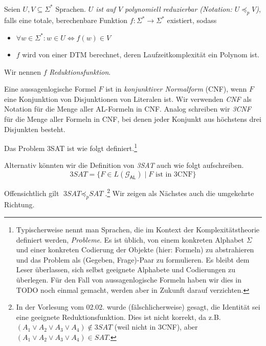 \begin{Def}\label{def:PolyReduktion}\ \\
  Seien $U, V \subseteq \Sigma^*$ Sprachen.
  \emph{$U$ ist auf $V$ polynomiell reduzierbar (Notation: $U \preceq_p V$)}, falls eine totale, berechenbare Funktion
  $f:\Sigma^* \to \Sigma^*$ existiert, sodass
  \begin{itemize}
   \item $\forall w \in \Sigma^*:w \in U \iff f(w) \in V$
   \item $f$ wird von einer \ac{DTM} berechnet, deren Laufzeitkomplexität ein Polynom ist.
  \end{itemize}
  Wir nennen $f$ \emph{Reduktionsfunktion}.
\end{Def}

Eine aussagenlogische Formel $F$ ist in \emph{konjunktiver Normalform} (CNF), wenn $F$ eine Konjunktion von Disjunktionen von Literalen ist.
Wir verwenden \emph{CNF} als Notation für die Menge aller AL-Formeln in CNF.
Analog schreiben wir \emph{3CNF} für die Menge aller Formeln in CNF, bei denen jeder Konjunkt aus höchstens drei Disjunkten besteht.



\begin{Def}[name={[\textit{3SAT}]}]
Das Problem 3SAT ist wie folgt definiert.\footnote{
Typischerweise nennt man Sprachen, die im Kontext der Komplexitätstheorie definiert werden, \emph{Probleme}.
Es ist üblich, von einem konkreten Alphabet $\Sigma$ und einer konkreten Codierung der Objekte (hier: Formeln) zu abstrahieren und das Problem als (Gegeben, Frage)-Paar zu formulieren.
Es bleibt dem Leser überlassen, sich selbst geeignete Alphabete und Codierungen zu überlegen.
Für den Fall von aussagenlogische Formeln haben wir dies in TODO noch einmal gemacht, werden aber in Zukunft darauf verzichten.}
\begin{center}
\end{center}
	
\end{Def}
Alternativ könnten wir die Definition von \textit{3SAT} auch wie folgt aufschreiben.
$$\textit{3SAT} = \{F\in L(\mathcal{G}_\mathsf{AL})\mid F \text{ ist in 3CNF}\}$$

Offensichtlich gilt $\textit{3SAT} \preceq_p \textit{SAT}$.\footnote{
In der Vorlesung vom 02.02. wurde (fälschlicherweise) gesagt, die Identität sei eine geeignete Reduktionsfunktion.
Dies ist nicht korrekt, da z.B. 
$(A_1\lor A_2\lor A_3\lor A_4)\notin \textit{3SAT}$
(weil nicht in 3CNF), aber $(A_1\lor A_2\lor A_3\lor A_4)\in \textit{SAT}$.
} Wir zeigen als Nächstes auch die umgekehrte Richtung.

